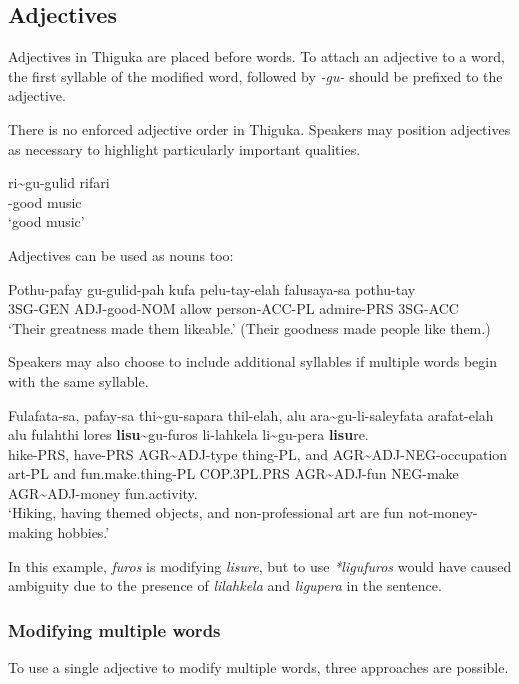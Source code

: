 
\subsection{Adjectives}
Adjectives in Thiguka are placed before words.
To attach an adjective to a word, the first syllable of the modified word, followed by \emph{-gu-} should be prefixed to the adjective.

There is no enforced adjective order in Thiguka. Speakers may position adjectives as necessary to highlight particularly important qualities.

\begin{exe}
    \ex{} \gll{}ri\~{}{}gu-gulid rifari\\
    \agradj{}-good music\\
    \glt{}`good music'
\end{exe}

Adjectives can be used as nouns too:

\begin{exe}
    \ex{} \gll{}Pothu-pafay gu-gulid-pah kufa pelu-tay-elah falusaya-sa pothu-tay\\
    3SG-GEN ADJ-good-NOM allow person-ACC-PL admire-PRS 3SG-ACC\\
    \glt{}`Their greatness made them likeable.' (Their goodness made people like them.)
\end{exe}

Speakers may also choose to include additional syllables if multiple words begin with the same syllable.
\begin{exe}
    \ex{} \gll{}Fulafata-sa, pafay-sa thi\~{}gu-sapara thil-elah, alu ara\~{}gu-li-saleyfata arafat-elah alu fulahthi lores \textbf{lisu}\~{}gu-furos li-lahkela li\~{}gu-pera \textbf{lisu}re.\\
    hike-PRS, have-PRS AGR\~{}ADJ-type thing-PL, and AGR\~{}ADJ-NEG-occupation art-PL and fun.make.thing-PL COP.3PL.PRS AGR\~{}ADJ-fun NEG-make AGR\~{}ADJ-money fun.activity.\\
    \glt{}`Hiking, having themed objects, and non-professional art are fun not-money-making hobbies.'
\end{exe}    

In this example, \textit{furos} is modifying \textit{lisure}, but to use \textit{*ligufuros} would have caused ambiguity due to the presence of \textit{lilahkela} and \textit{ligupera} in the sentence.

\subsubsection{Modifying multiple words}
To use a single adjective to modify multiple words, three approaches are possible.

